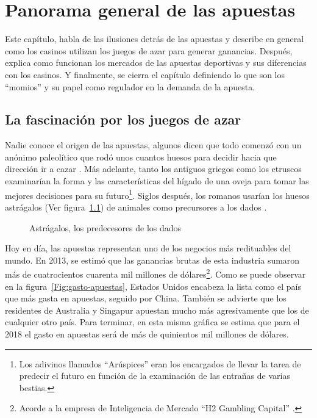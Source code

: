 \graphicspath{{/Users/brunomedina/Dropbox/Tesis-Egobets/egobets-notas/resources/marco/}}
\chapter{Panorama general de las apuestas}
\label{chap:general}

Este capítulo, habla de las ilusiones detrás de las apuestas y describe en general como los casinos utilizan los juegos de azar para generar ganancias. Después, explica como funcionan los mercados de las apuestas deportivas y sus diferencias con los casinos. Y finalmente, se cierra el capítulo definiendo lo que son los ``momios'' y su papel como regulador en la demanda de la apuesta. 

 \section{La fascinación por los juegos de azar}
 \label{sec:fascinacion}
 

Nadie conoce el origen de las apuestas, algunos dicen que todo comenzó con un anónimo paleolítico que rodó unos cuantos huesos para decidir hacia que dirección ir a cazar \cite{schwartz2013roll}. Más adelante, tanto los antiguos griegos como los etruscos examinarían la forma y las características del hígado de una oveja para tomar las mejores decisiones para su futuro\footnote{Los adivinos llamados ``Arúspices'' eran los encargados de llevar la tarea de predecir el futuro en función de la examinación de las entrañas de varias bestias.}. Siglos después, los romanos usarían los huesos astrágalos (Ver figura~\ref{Fig:huesos}) de animales como precursores a los dados \cite{schwartz2013roll}.

\begin{figure}[!htb]\centering
   \begin {minipage}{0.85\textwidth}
     \caption{Astrágalos, los predecesores de los dados}\label{Fig:huesos}
   \end{minipage}
\end{figure}

Hoy en día, las apuestas representan uno de los negocios más redituables del mundo. En 2013, se estimó que las ganancias brutas de esta industria sumaron más de cuatrocientos cuarenta mil millones de dólares\footnote{Acorde a la empresa de Inteligencia de Mercado ``H2 Gambling Capital'' \cite{economistHouseWins}.}. Como se puede observar en la figura~\ref{Fig:gasto-apuestas}, Estados Unidos encabeza la lista como el país que más gasta en apuestas, seguido por China. También se advierte que los residentes de Australia y Singapur apuestan mucho más agresivamente que los de cualquier otro país. Para terminar, en esta misma gráfica se estima que para el 2018 el gasto en apuestas será de más de quinientos mil millones de dólares.


